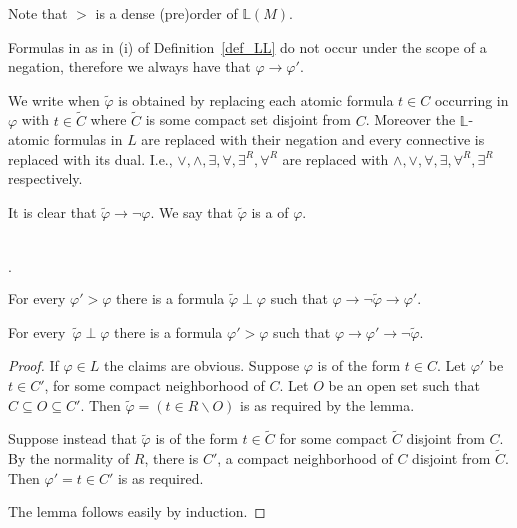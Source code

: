 \documentclass[11pt,oneside]{amsart}
\newcommand{\mylabel}[1]{{#1}\hfill}
\renewenvironment{itemize}
  {\begin{list}{$\cdot$}{%
  \setlength{\parskip}{0mm}
  \setlength{\topsep}{.2\baselineskip}
  \setlength{\rightmargin}{0mm}
  \setlength{\listparindent}{0mm}
  \setlength{\itemindent}{0mm}
  \setlength{\labelwidth}{3ex}
  \setlength{\itemsep}{.2\baselineskip}
  \setlength{\parsep}{.2\baselineskip}
  \setlength{\partopsep}{0mm}
  \setlength{\labelsep}{1ex}
  \setlength{\leftmargin}{\labelwidth+\labelsep}
  \let\makelabel\mylabel}}{%
\end{list}}
\renewcommand*{\emph}[1]{%
   \smash{\tikz[baseline]\node[rectangle, fill=teal!25, rounded corners, inner xsep=0.5ex, inner ysep=0.2ex, anchor=base, minimum height = 2.7ex]{#1};}}
\begin{document}
Note that $>$ is a dense (pre)order of $\mathds{L}(M)$.

Formulas in as in (i) of Definition~\ref{def_LL} do not occur under the scope of a negation, therefore we always have that $\varphi\to\varphi'$.

We write \emph{$\tilde{\varphi}\perp\varphi$\/} when $\tilde{\varphi}$ is obtained by replacing each atomic formula $t\in C$ occurring in $\varphi$ with $t\in\tilde{C}$ where $\tilde{C}$ is some compact set disjoint from $C$. 
Moreover the $\mathds{L}$-atomic formulas in $L$ are replaced with their negation and every connective is replaced with its dual.
I.e., $\vee, \wedge, \exists, \forall, \exists^R, \forall^R$ are replaced with $\wedge,\vee,\forall,\exists,\forall^R,\exists^R$ respectively.

It is clear that $\tilde{\varphi}\rightarrow\neg\varphi$.
We say that  $\tilde{\varphi}$ is a \emph{strong negation} of $\varphi$.

\begin{lemma}\label{lem_interpolation}\ 
  \begin{itemize}
    \item[1.]For every $\varphi'>\varphi$ there is a formula $\tilde{\varphi}\perp\varphi$ such that $\varphi\rightarrow\neg \tilde{\varphi}\rightarrow\varphi'$.
    \item[2.] For every\, $\tilde{\varphi}\perp\varphi$ there is a formula $\varphi'>\varphi$ such that  $\varphi\rightarrow\varphi'\rightarrow\neg \tilde{\varphi}$.
  \end{itemize}
\end{lemma}

\begin{proof}
  If $\varphi\in L$ the claims are obvious.
  Suppose $\varphi$ is of the form $t\in C$.
  Let $\varphi'$ be $t\in C'$, for some compact neighborhood of $C$.
  Let $O$ be an open set such that $C\subseteq O\subseteq C'$.
  Then $\tilde{\varphi}=(t\in R\smallsetminus O)$ is as required by the lemma.
  
  Suppose instead that $\tilde{\varphi}$ is of the form $t\in\tilde{C}$ for some compact $\tilde{C}$ disjoint from $C$.
  By the normality of $R$, there is  $C'$, a compact neighborhood of $C$ disjoint from $\tilde{C}$.
  Then  $\varphi'=t\in C'$ is as required.

  The lemma follows easily by induction.
\end{proof}


\end{document}
